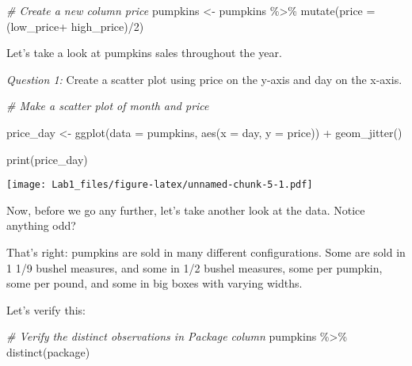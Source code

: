 \documentclass[
]{article}
\newenvironment{Shaded}{\begin{snugshade}}{\end{snugshade}}
\newcommand{\AttributeTok}[1]{\textcolor[rgb]{0.77,0.63,0.00}{#1}}
\newcommand{\CommentTok}[1]{\textcolor[rgb]{0.56,0.35,0.01}{\textit{#1}}}
\newcommand{\DecValTok}[1]{\textcolor[rgb]{0.00,0.00,0.81}{#1}}
\newcommand{\FunctionTok}[1]{\textcolor[rgb]{0.00,0.00,0.00}{#1}}
\newcommand{\NormalTok}[1]{#1}
\newcommand{\OtherTok}[1]{\textcolor[rgb]{0.56,0.35,0.01}{#1}}
\newcommand{\SpecialCharTok}[1]{\textcolor[rgb]{0.00,0.00,0.00}{#1}}
\begin{document}
\begin{Shaded}
\begin{Highlighting}[]
\CommentTok{\# Create a new column price}
\NormalTok{pumpkins }\OtherTok{\textless{}{-}}\NormalTok{ pumpkins }\SpecialCharTok{\%\textgreater{}\%} 
  \FunctionTok{mutate}\NormalTok{(}\AttributeTok{price =}\NormalTok{ (low\_price}\SpecialCharTok{+}\NormalTok{ high\_price)}\SpecialCharTok{/}\DecValTok{2}\NormalTok{)}
\end{Highlighting}
\end{Shaded}

Let's take a look at pumpkins sales throughout the year.

\emph{Question 1:} Create a scatter plot using price on the y-axis and
day on the x-axis.

\begin{Shaded}
\begin{Highlighting}[]
\CommentTok{\# Make a scatter plot of month and price}

\NormalTok{price\_day }\OtherTok{\textless{}{-}} \FunctionTok{ggplot}\NormalTok{(}\AttributeTok{data =}\NormalTok{ pumpkins, }
                    \FunctionTok{aes}\NormalTok{(}\AttributeTok{x =}\NormalTok{ day,}
                        \AttributeTok{y =}\NormalTok{ price)) }\SpecialCharTok{+}
  \FunctionTok{geom\_jitter}\NormalTok{()}

\FunctionTok{print}\NormalTok{(price\_day)}
\end{Highlighting}
\end{Shaded}

\texttt{[image: Lab1\_files/figure-latex/unnamed-chunk-5-1.pdf]}

Now, before we go any further, let's take another look at the data.
Notice anything odd?

That's right: pumpkins are sold in many different configurations. Some
are sold in 1 1/9 bushel measures, and some in 1/2 bushel measures, some
per pumpkin, some per pound, and some in big boxes with varying widths.

Let's verify this:

\begin{Shaded}
\begin{Highlighting}[]
\CommentTok{\# Verify the distinct observations in Package column}
\NormalTok{pumpkins }\SpecialCharTok{\%\textgreater{}\%} 
  \FunctionTok{distinct}\NormalTok{(package)}
\end{Highlighting}
\end{Shaded}
\end{document}
